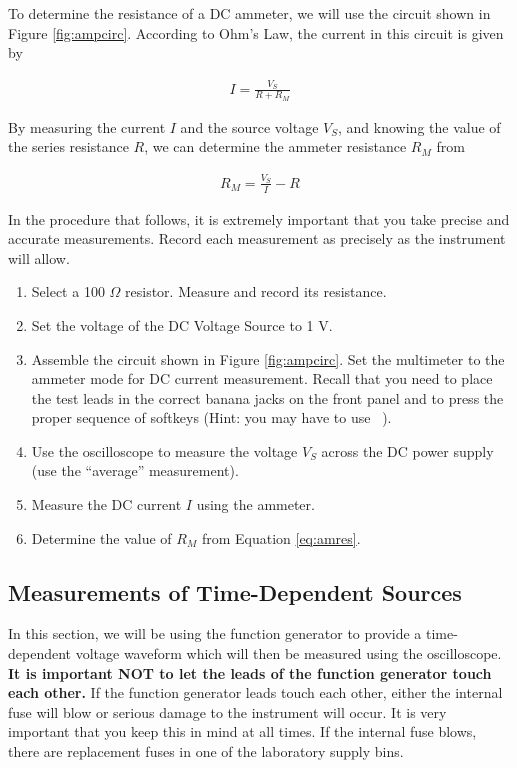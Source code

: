 \documentclass[12pt]{../manual}
\begin{document}
To determine the resistance of a DC ammeter, we will use the circuit shown in Figure \ref{fig:ampcirc}. According to Ohm's Law, the current in this circuit is given by

\begin{align}
I = \frac{V_S}{R + R_M}
\end{align}

 By measuring the current $I$ and the source voltage $V_S$, and knowing the value of the series resistance $R$, we can determine the ammeter resistance $R_M$ from

\begin{align}
R_M = \frac{V_S}{I} - R \label{eq:amres}
\end{align}

In the procedure that follows, it is extremely important that you take precise and accurate measurements. Record each measurement as precisely as the instrument will allow.
\begin{enumerate}
\item Select a 100 $\Omega$ resistor. Measure and record its resistance. 
\item Set the voltage of the DC Voltage Source to 1 V.
\item Assemble the circuit shown in Figure \ref{fig:ampcirc}. Set the multimeter to the ammeter mode for DC current measurement. Recall that you need to place the test leads in the correct banana jacks on the front panel and to press the proper sequence of softkeys (Hint: you may have to use ~). 
\item Use the oscilloscope to measure the voltage $V_S$ across the DC power supply (use the ``average'' measurement).
\item Measure the DC current $I$ using the ammeter. 
\item Determine the value of $R_M$ from Equation \eqref{eq:amres}. 
\end{enumerate}

\subsection{Measurements of Time-Dependent Sources}
In this section, we will be using the function generator to provide a time-dependent voltage waveform which will then be measured using the oscilloscope. \textbf{It is important NOT to let the leads of the function generator touch each other.} If the function generator leads touch each other, either the internal fuse will blow or serious damage to the instrument will occur. It is very important that you keep this in mind at all times. If the internal fuse blows, there are replacement fuses in one of the laboratory supply bins.
\end{document}
